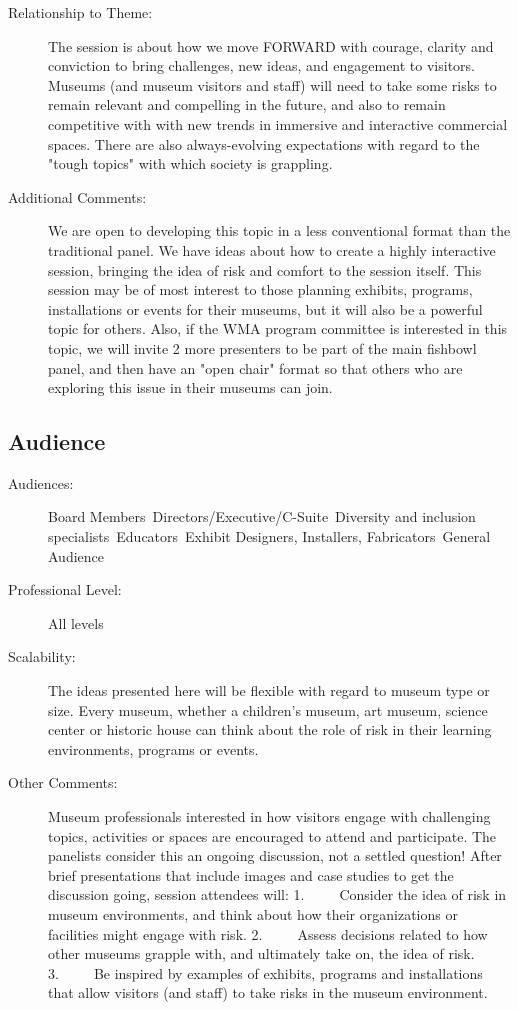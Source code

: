 \documentclass{report}
\begin{document}
\begin{description}
							    \item [Relationship to Theme:]The session is about how we move FORWARD with courage, clarity and conviction to bring challenges, new ideas, and engagement to visitors. Museums (and museum visitors and staff) will need to take some risks to remain relevant and compelling in the future, and also to remain competitive with with new trends in immersive and interactive commercial spaces. There are also always-evolving expectations with regard to the "tough topics" with which society is grappling.
							    
                    \item [Additional Comments: ]  We are open to developing this topic in a less conventional format than the traditional panel. We have ideas about how to create a highly interactive session, bringing the idea of risk and comfort to the session itself. This session may be of most interest to those planning exhibits, programs, installations or events for their museums, but it will also be a powerful topic for others.
 Also, if the WMA program committee is interested in this topic, we will invite 2 more presenters to be part of the main fishbowl panel, and then have an "open chair" format so that others who are exploring this issue in their museums can join. 

                \end{description}
              \subsection*{Audience}
                \begin{description}
                  \item [Audiences:]Board Members~Directors/Executive/C-Suite~Diversity and inclusion specialists~Educators~Exhibit Designers, Installers, Fabricators~General Audience~
                  \item[Professional Level:]All levels~
                \item[Scalability:] The ideas presented here will be flexible with regard to museum type or size. Every museum, whether a children’s museum, art museum, science center or historic house can think about the role of risk in their learning environments, programs or events.

							
              \item[Other Comments:] Museum professionals interested in how visitors engage with challenging topics, activities or spaces are encouraged to attend and participate. The panelists consider this an ongoing discussion, not a settled question! After brief presentations that include images and case studies to get the discussion going, session attendees will:
1.     Consider the idea of risk in museum environments, and think about how their organizations or facilities might engage with risk.
2.     Assess decisions related to how other museums grapple with, and ultimately take on, the idea of risk.
3.     Be inspired by examples of exhibits, programs and installations that allow visitors (and staff) to take risks in the museum environment.
              \end{description}
\end{document}
